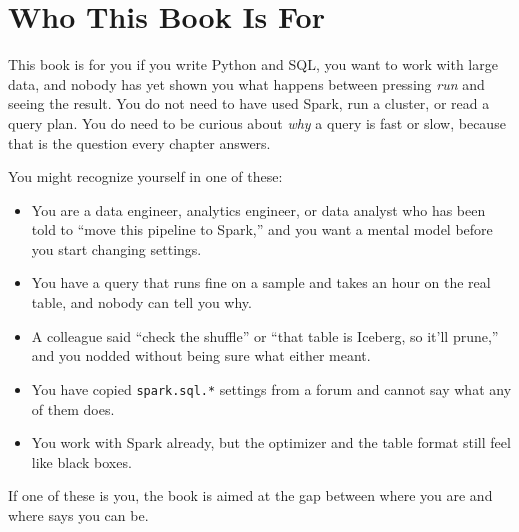 \chapter{Who This Book Is For}
\label{ch:who-for}

This book is for you if you write Python and SQL, you want to work with large
data, and nobody has yet shown you what happens between pressing \emph{run} and
seeing the result. You do not need to have used Spark, run a cluster, or read a
query plan. You do need to be curious about \emph{why} a query is fast or slow,
because that is the question every chapter answers.

You might recognize yourself in one of these:

\begin{itemize}
  \item You are a data engineer, analytics engineer, or data analyst who has been
  told to ``move this pipeline to Spark,'' and you want a mental model before you
  start changing settings.
  \item You have a query that runs fine on a sample and takes an hour on the real
  table, and nobody can tell you why.
  \item A colleague said ``check the shuffle'' or ``that table is Iceberg, so
  it'll prune,'' and you nodded without being sure what either meant.
  \item You have copied \texttt{spark.sql.*} settings from a forum and cannot say
  what any of them does.
  \item You work with Spark already, but the optimizer and the table format still
  feel like black boxes.
\end{itemize}

If one of these is you, the book is aimed at the gap between where you are and
where  says you can be.

